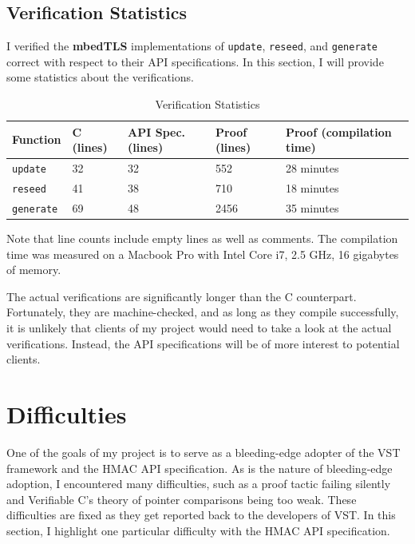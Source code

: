 \documentclass[pageno]{jpaper}
\newcommand{\stdtitle}[1]{\textbf{#1}}
\begin{document}
\subsection{Verification Statistics}

I verified the \stdtitle{mbedTLS} implementations of \lstinline{update}, \lstinline{reseed}, and \lstinline{generate} correct with respect to their API specifications. In this section, I will provide some statistics about the verifications.

\begin{table}[h!]
  \centering
  \begin{tabular}{|l|l|l|l|l|}
    \hline
    \textbf{Function} & \textbf{C (lines)} & \textbf{API Spec. (lines)} & \textbf{Proof (lines)} & \textbf{Proof (compilation time)}\\
    \hline
    \hline
    \lstinline{update} & 32 & 32 & 552 & 28 minutes \\
    \hline
    \lstinline{reseed} & 41 & 38 & 710 & 18 minutes \\
    \hline
    \lstinline{generate} & 69 & 48 & 2456 & 35 minutes \\
    \hline
  \end{tabular}
  \caption{Verification Statistics}
  \label{table:stats}
\end{table}

Note that line counts include empty lines as well as comments. The compilation time was measured on a Macbook Pro with Intel Core i7, 2.5 GHz, 16 gigabytes of memory.

The actual verifications are significantly longer than the C counterpart. Fortunately, they are machine-checked, and as long as they compile successfully, it is unlikely that clients of my project would need to take a look at the actual verifications. Instead, the API specifications will be of more interest to potential clients.

\section{Difficulties}

One of the goals of my project is to serve as a bleeding-edge adopter of the VST framework and the HMAC API specification. As is the nature of bleeding-edge adoption, I encountered many difficulties, such as a proof tactic failing silently and Verifiable C's theory of pointer comparisons being too weak. These difficulties are fixed as they get reported back to the developers of VST. In this section, I highlight one particular difficulty with the HMAC API specification.
\end{document}
